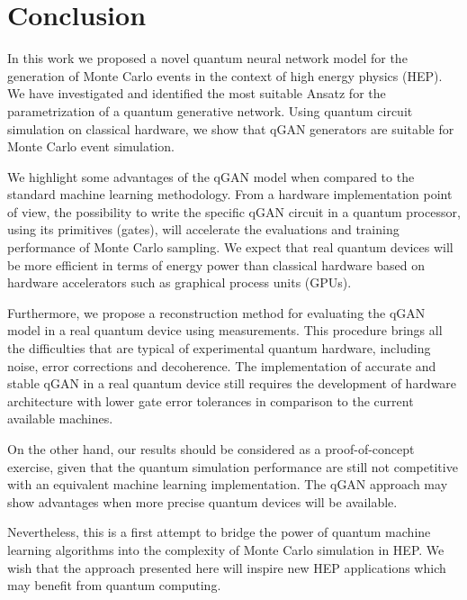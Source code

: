 \documentclass[twocolumn,preprintnumbers,superscriptaddress]{revtex4-2}
\begin{document}
\section{Conclusion}
\label{sec:conclusion}

In this work we proposed a novel quantum neural network model for the generation
of Monte Carlo events in the context of high energy physics (HEP). We have
investigated and identified the most suitable Ansatz for the parametrization of
a quantum generative network. Using quantum circuit simulation on classical
hardware, we show that qGAN generators are suitable for Monte Carlo event
simulation.

We highlight some advantages of the qGAN model when compared to the standard
machine learning methodology. From a hardware implementation point of view, the
possibility to write the specific qGAN circuit in a quantum processor, using its
primitives (gates), will accelerate the evaluations and training performance of
Monte Carlo sampling. We expect that real quantum devices will be more efficient
in terms of energy power than classical hardware based on hardware accelerators
such as graphical process units (GPUs).

Furthermore, we propose a reconstruction method for evaluating the qGAN model in
a real quantum device using measurements. This procedure brings all the
difficulties that are typical of experimental quantum hardware, including noise,
error corrections and decoherence. The implementation of accurate and stable
qGAN in a real quantum device still requires the development of hardware
architecture with lower gate error tolerances in comparison to the current
available machines.

On the other hand, our results should be considered as a proof-of-concept
exercise, given that the quantum simulation performance are still not
competitive with an equivalent machine learning implementation. The qGAN
approach may show advantages when more precise quantum devices will be
available.

Nevertheless, this is a first attempt to bridge the power of quantum machine
learning algorithms into the complexity of Monte Carlo simulation in HEP. We
wish that the approach presented here will inspire new HEP applications which
may benefit from quantum computing.

\iffalse
\end{document}
